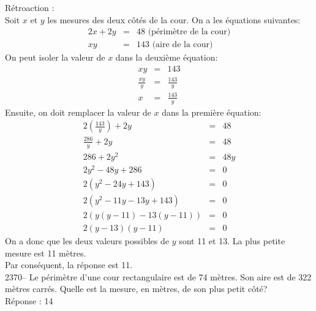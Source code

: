 \documentclass[letterpaper, 12pt]{article}
\begin{document}
R\'etroaction :\\
Soit $x$ et $y$ les mesures des deux c\^ot\'es de la cour. On a les \'equations suivantes:
\begin{eqnarray*}
 2x+2y&=&48 \textrm{   (p\'erim\`etre de la cour)}\\
xy&=&143 \textrm{   (aire de la cour)}
\end{eqnarray*}
On peut isoler la valeur de $x$ dans la deuxi\`eme \'equation:
\begin{eqnarray*}
 xy&=&143\\[2mm]
 \frac{xy}{y}&=&\frac{143}{y}\\[2mm]
x&=&\frac{143}{y}
\end{eqnarray*}
Ensuite, on doit remplacer la valeur de $x$ dans la premi\`ere \'equation:
\begin{eqnarray*}
  2\left( \frac{143}{y}\right) +2y&=&48\\[2mm]
 \frac{286}{y}+2y&=&48\\[2mm]
 286+2y^{2}&=&48y\\
 2y^{2}-48y+286&=&0\\
 2(y^{2}-24y+143)&=&0\\
 2(y^{2}-11y-13y+143)&=&0\\
 2(y(y-11)-13(y-11))&=&0\\
 2(y-13)(y-11)&=&0
\end{eqnarray*}
On a donc que les deux valeurs possibles de $y$ sont 11 et 13. La plus petite mesure est 11 m\`etres.\\
Par cons\'equent, la r\'eponse est 11.\\

2370-- Le p\'erim\`etre d'une cour rectangulaire est de 74 m\`etres. Son aire est de 322 m\`etres carr\'es. Quelle est la mesure, en m\`etres, de son plus petit c\^ot\'e?\\

R\'eponse : 14\\
\end{document}
